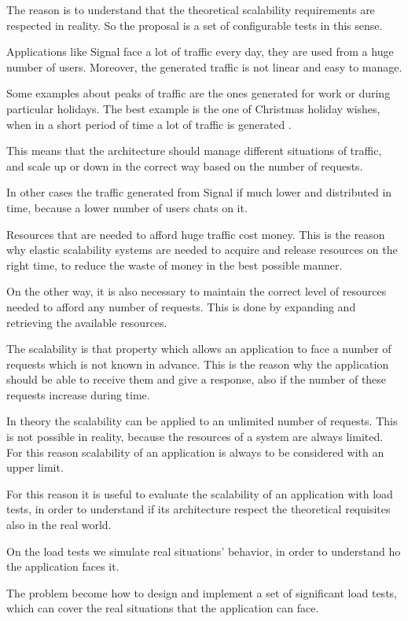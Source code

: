 The reason is to understand that the theoretical scalability requirements are respected in reality. So the proposal is a set of configurable tests in this sense.

Applications like Signal face a lot of traffic every day, they are used from a huge number of users.
Moreover, the generated traffic is not linear and easy to manage.

Some examples about peaks of traffic are the ones generated for work or during particular holidays.
The best example is the one of Christmas holiday wishes, when in a short period of time a lot of traffic is generated \cite{gunawi2016does}.

This means that the architecture should manage different situations of traffic, and scale up or down in the correct way based on the number of requests.

In other cases the traffic generated from Signal if much lower and distributed in time, because a lower number of users chats on it.

Resources that are needed to afford huge traffic cost money. This is the reason why elastic scalability systems are needed to acquire and release resources on the right time, to reduce the waste of money in the best possible manner.

On the other way, it is also necessary to maintain the correct level of resources needed to afford any number of requests.
This is done by expanding and retrieving the available resources.

The scalability is that property which allows an application to face a number of requests which is not known in advance.
This is the reason why the application should be able to receive them and give a response, also if the number of these requests increase during time.

In theory the scalability can be applied to an unlimited number of requests. This is not possible in reality, because the resources of a system are always limited.
For this reason scalability of an application is always to be considered with an upper limit.

For this reason it is useful to evaluate the scalability of an application with load tests, in order to understand if its architecture respect the theoretical requisites also in the real world.

On the load tests we simulate real situations' behavior, in order to understand ho the application faces it.

The problem become how to design and implement a set of significant load tests, which can cover the real situations that the application can face.

